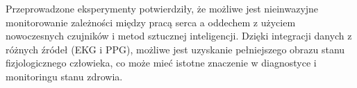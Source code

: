 \documentclass{article}
\begin{document}
Przeprowadzone eksperymenty potwierdziły, że możliwe jest nieinwazyjne monitorowanie zależności między pracą serca a oddechem z użyciem nowoczesnych czujników i metod sztucznej inteligencji. Dzięki integracji danych z różnych źródeł (EKG i PPG), możliwe jest uzyskanie pełniejszego obrazu stanu fizjologicznego człowieka, co może mieć istotne znaczenie w diagnostyce i monitoringu stanu zdrowia.
\end{document}
